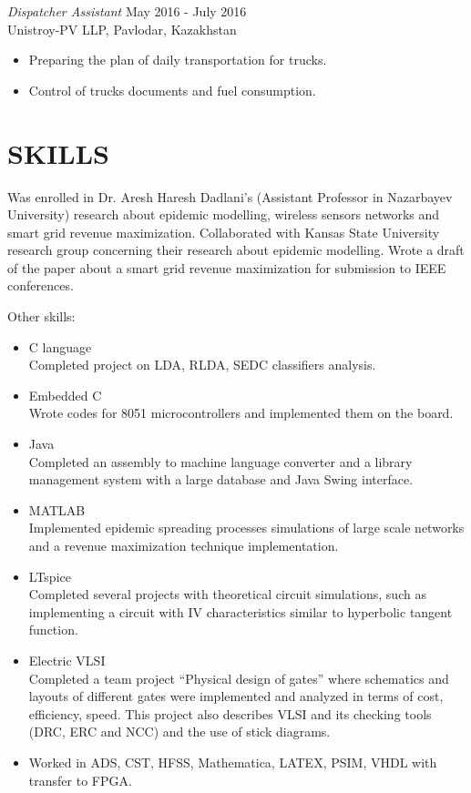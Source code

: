 \documentclass[margin, 10pt]{res} %
\begin{document}
\begin{resume}
{\sl Dispatcher Assistant} \hfill May 2016 - July 2016 \\
Unistroy-PV LLP, Pavlodar, Kazakhstan
\begin{itemize}
\item Preparing the plan of daily transportation for trucks.
\item Control of trucks documents and fuel consumption.
\end{itemize} 




\section{SKILLS} 
Was enrolled in Dr. Aresh Haresh Dadlani's (Assistant Professor in Nazarbayev University) research about epidemic modelling, wireless sensors networks and smart grid revenue maximization. Collaborated with Kansas State University research group concerning their research about epidemic modelling. Wrote a draft of the paper about a smart grid revenue maximization for submission to IEEE conferences.

Other skills:

\begin{itemize}
\item C language\\
Completed project on LDA, RLDA, SEDC classifiers analysis.
\item Embedded C\\
Wrote codes for 8051 microcontrollers and implemented them on the board.
\item Java\\
Completed an assembly to machine language converter and a library management system with a large database and Java Swing interface.
\item MATLAB\\
Implemented epidemic spreading processes simulations of large scale networks and a revenue maximization technique implementation.
\item LTspice\\
Completed several projects with theoretical circuit simulations, such as implementing a circuit with IV characteristics similar to hyperbolic tangent function. 
\item Electric VLSI\\ 
Completed a team project “Physical design of gates” where schematics and layouts of different gates were implemented and analyzed in terms of cost, efficiency, speed. This project also describes VLSI and its checking tools (DRC, ERC and NCC) and the use of stick diagrams.
\item Worked in ADS, CST, HFSS, Mathematica, LATEX, PSIM, VHDL with transfer to FPGA.



\end{itemize}
\end{resume}
\end{document}
